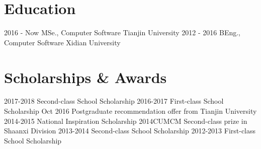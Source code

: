 \documentclass[utf8]{twentysecondcv} %
\begin{document}
\makeprofile %

\section{Education}

\begin{twentyshort}
    \twentyitemshort
        {2016 - Now}
        {MSe., Computer Software \hfill{Tianjin University}}	
	\twentyitemshort
		{2012 - 2016}
		{BEng., Computer Software \hfill{Xidian University}}		
\end{twentyshort}





\section{Scholarships \& Awards}

\begin{twentyshort}
    \twentyitemshort
        {2017-2018}
        {Second-class School Scholarship}
	\twentyitemshort
        {2016-2017}
        {First-class School Scholarship}
	\twentyitemshort
		{Oct 2016}        
		{Postgraduate recommendation offer from Tianjin University}
	\twentyitemshort
		{2014-2015}
		{National Inspiration Scholarship}
	\twentyitemshort
		{2014CUMCM}
		{Second-class prize in Shaanxi Division}
	\twentyitemshort
		{2013-2014}
		{Second-class School Scholarship}		
	\twentyitemshort
		{2012-2013}
		{First-class School Scholarship}		
\end{twentyshort}        
\end{document}
